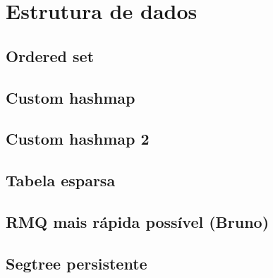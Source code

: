 \section{Estrutura de dados}

\subsection{Ordered set}


\subsection{Custom hashmap}


\subsection{Custom hashmap 2}


\subsection{Tabela esparsa}


\subsection{RMQ mais rápida possível (Bruno)}


\subsection{Segtree persistente}
